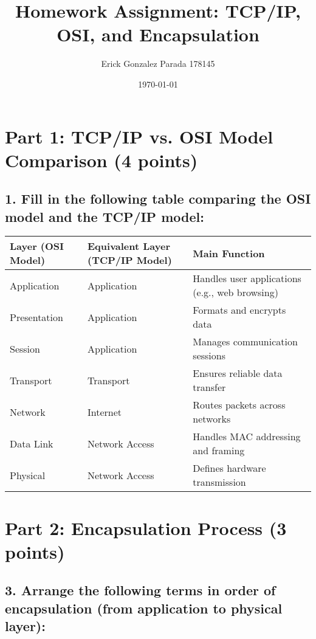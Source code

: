 \documentclass{article}
\begin{document}
\title{Homework Assignment: TCP/IP, OSI, and Encapsulation}
\author{Erick Gonzalez Parada 178145}
\date{\today}

\maketitle

\section*{Part 1: TCP/IP vs. OSI Model Comparison (4 points)}

\subsection*{1. Fill in the following table comparing the OSI model and the TCP/IP model:}

\begin{table}[H]
\centering
\begin{tabularx}{\textwidth}{|l|l|X|}
\hline
\textbf{Layer (OSI Model)} & \textbf{Equivalent Layer (TCP/IP Model)} & \textbf{Main Function} \\
\hline
Application & Application & Handles user applications (e.g., web browsing) \\
\hline
Presentation & Application & Formats and encrypts data \\
\hline
Session & Application & Manages communication sessions \\
\hline
Transport & Transport & Ensures reliable data transfer \\
\hline
Network & Internet & Routes packets across networks \\
\hline
Data Link & Network Access & Handles MAC addressing and framing \\
\hline
Physical & Network Access & Defines hardware transmission \\
\hline
\end{tabularx}
\end{table}

\section*{Part 2: Encapsulation Process (3 points)}

\subsection*{3. Arrange the following terms in order of encapsulation (from application to physical layer):}
\end{document}
